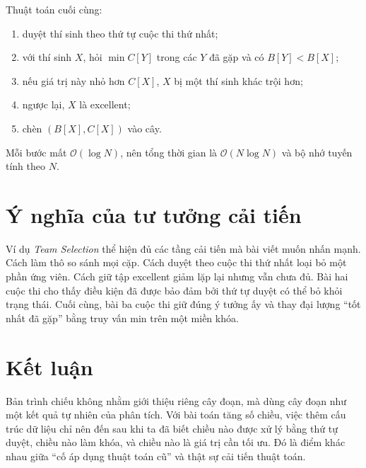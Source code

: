 \documentclass[11pt]{article}
\newcommand{\Oh}{\mathcal{O}}
\begin{document}
Thuật toán cuối cùng:
\begin{enumerate}
  \item duyệt thí sinh theo thứ tự cuộc thi thứ nhất;
  \item với thí sinh \(X\), hỏi \(\min C[Y]\) trong các \(Y\) đã gặp và có
  \(B[Y]<B[X]\);
  \item nếu giá trị này nhỏ hơn \(C[X]\), \(X\) bị một thí sinh khác trội hơn;
  \item ngược lại, \(X\) là excellent;
  \item chèn \((B[X],C[X])\) vào cây.
\end{enumerate}
Mỗi bước mất \(\Oh(\log N)\), nên tổng thời gian là \(\Oh(N\log N)\) và bộ
nhớ tuyến tính theo \(N\).

\section{Ý nghĩa của tư tưởng cải tiến}

Ví dụ \textit{Team Selection} thể hiện đủ các tầng cải tiến mà bài viết muốn
nhấn mạnh. Cách làm thô so sánh mọi cặp. Cách duyệt theo cuộc thi thứ nhất
loại bỏ một phần ứng viên. Cách giữ tập excellent giảm lặp lại nhưng vẫn chưa
đủ. Bài hai cuộc thi cho thấy điều kiện đã được bảo đảm bởi thứ tự duyệt có
thể bỏ khỏi trạng thái. Cuối cùng, bài ba cuộc thi giữ đúng ý tưởng ấy và thay
đại lượng ``tốt nhất đã gặp'' bằng truy vấn min trên một miền khóa.

\section{Kết luận}

Bản trình chiếu không nhằm giới thiệu riêng cây đoạn, mà dùng cây đoạn như
một kết quả tự nhiên của phân tích. Với bài toán tăng số chiều, việc thêm cấu
trúc dữ liệu chỉ nên đến sau khi ta đã biết chiều nào được xử lý bằng thứ tự
duyệt, chiều nào làm khóa, và chiều nào là giá trị cần tối ưu. Đó là điểm
khác nhau giữa ``cố áp dụng thuật toán cũ'' và thật sự cải tiến thuật toán.
\end{document}
